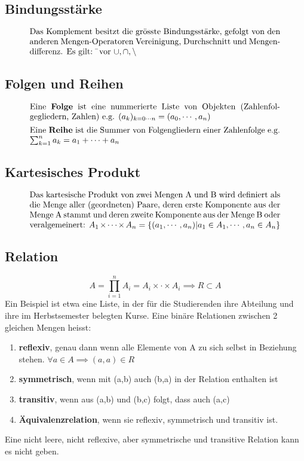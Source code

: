 \documentclass[../Main.tex]{subfiles}
\begin{document}
\subsection{Bindungsstärke}
\begin{equation}
    \parbox{30em}{Das Komplement besitzt 
    die grösste Bindungsstärke, gefolgt von den anderen Mengen-Operatoren Vereinigung, Durchschnitt und Mengendifferenz. Es gilt: \(\bar{}\) vor \(\cup,\cap,\backslash\)}
\end{equation}
\subsection{Folgen und Reihen}
\begin{equation}
    \parbox{30em}{Eine \textbf{Folge} ist eine nummerierte Liste von Objekten (Zahlenfolgegliedern, Zahlen) e.g. \((a_k)_{k=0 \cdots n} = (a_0, \cdots,a_n)\)}
\end{equation}
\begin{equation}
    \parbox{30em}{Eine \textbf{Reihe} ist die Summer von Folgengliedern einer Zahlenfolge e.g. \(\sum_{k=1}^{n}{a_k}=a_1+\cdots+a_n\)}
\end{equation}
\subsection{Kartesisches Produkt}
\begin{equation}
    \parbox{30em}{Das kartesische Produkt von zwei Mengen A und B wird definiert als die Menge aller (geordneten) Paare, 
    deren erste Komponente aus der Menge A stammt und deren zweite Komponente aus der Menge B oder veralgemeinert: 
    \(A_1 \times \cdots \times A_n=\{ (a_1, \cdots ,a_n) | a_1 \in A_1, \cdots ,a_n \in A_n \}\)}
\end{equation}
\subsection{Relation}
\begin{equation}
    A = \prod_{i=1}^{n} A_i = A_i \times \cdot \times A_i \implies R \subset A
\end{equation}
Ein Beispiel ist etwa eine Liste, in der für die Studierenden ihre Abteilung und ihre im Herbstsemester belegten Kurse.
Eine binäre Relationen zwischen 2 gleichen Mengen heisst:
\begin{enumerate}
    \item \textbf{reflexiv}, genau dann wenn alle Elemente von A zu sich selbst in Beziehung stehen. \(\forall a \in A \implies (a,a) \in R\)
    \item \textbf{symmetrisch}, wenn mit (a,b) auch (b,a) in der Relation enthalten ist
    \item \textbf{transitiv}, wenn aus (a,b) und (b,c) folgt, dass auch (a,c)
    \item \textbf{Äquivalenzrelation}, wenn sie reflexiv, symmetrisch und transitiv ist.
\end{enumerate}
Eine nicht leere, nicht reflexive, aber symmetrische und transitive Relation kann es nicht 
geben.
\end{document}
